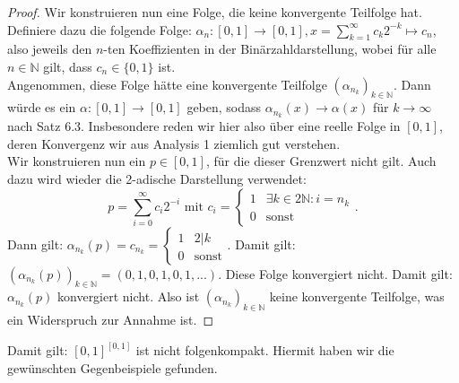 \documentclass[11pt]{scrartcl}
\newcommand{\N}{\mathbb{N}}
\begin{document}
\begin{proof}
	Wir konstruieren nun eine Folge, die keine konvergente Teilfolge hat. Definiere dazu die folgende Folge:
	$\alpha_n: [0,1]\rightarrow [0,1], x = \sum_{k=1}^\infty c_k 2^{-k} \mapsto c_n$, also jeweils den $n$-ten
	Koeffizienten in der Binärzahldarstellung, wobei für alle $n\in\N$ gilt, dass $c_n \in \{ 0,1\}$ ist.\\
	Angenommen, diese Folge hätte eine konvergente Teilfolge $(\alpha_{n_k})_{k\in\mathbb N}$. Dann würde es ein $\alpha:[0,1]\rightarrow[0,1]$
	geben, sodass $\alpha_{n_k}(x)\rightarrow \alpha(x)$ für $k\rightarrow \infty$ nach Satz 6.3. Insbesondere reden wir hier also über eine reelle Folge
	in $[0,1]$, deren Konvergenz wir aus Analysis 1 ziemlich gut verstehen.\\
	Wir konstruieren nun ein $p\in [0,1]$, für die dieser Grenzwert nicht gilt. Auch dazu wird wieder die 2-adische Darstellung verwendet: $$p= \sum_{i=0}^\infty c_i 2^{-i} \textrm{ mit } c_i=\begin{cases}
		1 & \exists k\in 2\N: i=n_k\\
		0 & \textrm{sonst}
	\end{cases}.$$ 
	Dann gilt: $\alpha_{n_k}(p)= c_{n_k}=\begin{cases}1&2|k\\0&\textrm{sonst}\end{cases}$. Damit gilt: $(\alpha_{n_k}(p))_{k\in\mathbb N}=(0,1,0,1,0,1,...)$. Diese Folge konvergiert nicht. Damit gilt: $\alpha_{n_k}(p)$
	konvergiert nicht. Also ist $(\alpha_{n_k})_{k\in\mathbb N}$ keine konvergente Teilfolge, was ein Widerspruch zur Annahme ist.
\end{proof}
Damit gilt: $[0,1]^{[0,1]}$ ist nicht folgenkompakt. Hiermit haben wir die gewünschten Gegenbeispiele gefunden.
\end{document}

